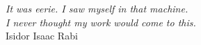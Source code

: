 %
\begin{frontmatter}

%
%
\makefrontmatter

%
%
%
%
%
%


%
%



%
%
\begin{epigraph} %
  \emph{It was eerie. I saw myself in that machine.\\
  I never thought my work would come to this. }\\
  Isidor Isaac Rabi
\end{epigraph}

%



\end{frontmatter}
